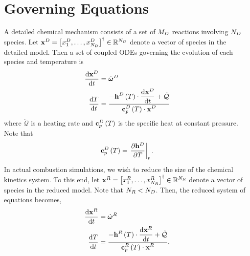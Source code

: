 \section{Governing Equations}
A detailed chemical mechanism consists of a set of $M_{D}$ reactions involving $N_{D}$ species.  Let $\mathbf{x}^{D} = \left[x_{1}^{D}, \ldots, x_{N_{D}}^{D}\right]^{\dagger} \in \mathbb{R}^{N_{D}}$ denote a vector of species in the detailed model.  Then a set of coupled ODEs governing the evolution of each species and temperature is
\begin{align}
  \frac{\mathrm{d} \mathbf{x}^{D}}{\mathrm{d} t} &= \dot{\boldsymbol{\omega}}^{D} \\
  \frac{\mathrm{d} T}{\mathrm{d} t}   &= \frac{\displaystyle -\mathbf{h}^{D}\left(T\right)\cdot\frac{\mathrm{d} \mathbf{x}^{D}}{\mathrm{d} t} + \dot{\mathcal{Q}}}{\displaystyle \mathbf{c}_{p}^{D}\left(T\right)\cdot\mathbf{x}^{D}}
\end{align}
where $\dot{\mathcal{Q}}$ is a heating rate and $\mathbf{c}_{p}^{D}\left(T\right)$ is the specific heat at constant pressure.  Note that
\begin{align}
  \mathbf{c}_{p}^{D}\left(T\right) = \left.\frac{\partial \mathbf{h}^{D}}{\partial T}\right|_{p}.
\end{align}
In actual combustion simulations, we wish to reduce the size of the chemical kinetics system.  To this end, let $\mathbf{x}^{R} = \left[x_{1}^{R}, \ldots, x_{N_{R}}^{R}\right]^{\dagger} \in \mathbb{R}^{N_{R}}$ denote a vector of species in the reduced model.  Note that $N_{R} < N_{D}$.  Then, the reduced system of equations becomes,
\begin{align}
  \frac{\mathrm{d} \mathbf{x}^{R}}{\mathrm{d} t} &= \dot{\boldsymbol{\omega}}^{R} \label{eq:reduced}\\
  \frac{\mathrm{d} T}{\mathrm{d} t}   &= \frac{\displaystyle -\mathbf{h}^{R}\left(T\right)\cdot\frac{\mathrm{d} \mathbf{x}^{R}}{\mathrm{d} t} + \dot{\mathcal{Q}}}{\displaystyle \mathbf{c}_{p}^{R}\left(T\right)\cdot\mathbf{x}^{R}}. \label{eq:reduced_T}
\end{align}
